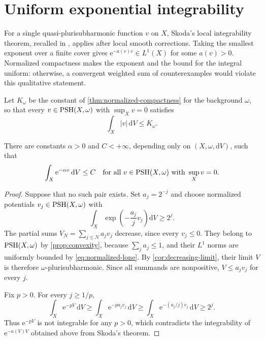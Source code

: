 \section{Uniform exponential integrability}

For a single quasi-plurisubharmonic function $v$ on $X$, Skoda's local integrability theorem, recalled in \cite{SGPT}, applies after local smooth corrections. Taking the smallest exponent over a finite cover gives $\mathrm{e}^{-a(v)v}\in L^1(X)$ for some $a(v)>0$. Normalized compactness makes the exponent and the bound for the integral uniform: otherwise, a convergent weighted sum of counterexamples would violate this qualitative statement.

Let $K_\omega$ be the constant of \cref{thm:normalized-compactness} for the background $\omega$, so that every $v\in\mathrm{PSH}(X,\omega)$ with $\sup_Xv=0$ satisfies
\begin{equation}\label{eq:normalized-lone}
 \int_X|v|\,\mathrm{d}V\leq K_\omega.
\end{equation}

\begin{lemma}\label{lem:uniform-exponential}
There are constants $\alpha>0$ and $C<+\infty$, depending only on $(X,\omega,\mathrm{d}V)$, such that
\[
 \int_X\mathrm{e}^{-\alpha v}\,\mathrm{d}V\leq C
 \quad\hbox{for all }v\in\mathrm{PSH}(X,\omega)\hbox{ with }\sup_Xv=0.
\]
\end{lemma}
\begin{proof}
Suppose that no such pair exists. Set $a_j=2^{-j}$ and choose normalized potentials $v_j\in\mathrm{PSH}(X,\omega)$ with
\[
 \int_X\exp\!\left(-\frac{a_j}{j}v_j\right)\mathrm{d}V\geq2^j.
\]
The partial sums $V_N=\sum_{j\leq N}a_jv_j$ decrease, since every $v_j\leq0$. They belong to $\mathrm{PSH}(X,\omega)$ by \cref{prop:convexity}, because $\sum_ja_j\leq1$, and their $L^1$ norms are uniformly bounded by \eqref{eq:normalized-lone}. By \cref{cor:decreasing-limit}, their limit $V$ is therefore $\omega$-plurisubharmonic. Since all summands are nonpositive, $V\leq a_jv_j$ for every $j$.

Fix $p>0$. For every $j\geq1/p$,
\[
 \int_X\mathrm{e}^{-pV}\,\mathrm{d}V
 \geq\int_X\mathrm{e}^{-pa_jv_j}\,\mathrm{d}V
 \geq\int_X\mathrm{e}^{-(a_j/j)v_j}\,\mathrm{d}V
 \geq2^j.
\]
Thus $\mathrm{e}^{-pV}$ is not integrable for any $p>0$, which contradicts the integrability of $\mathrm{e}^{-a(V)V}$ obtained above from Skoda's theorem.
\end{proof}
